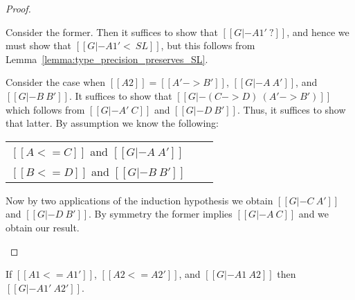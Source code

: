 \begin{proof}
\begin{itemize}
    Consider the former.  Then it suffices to show that $[[G |- A1' ~ ?]]$,
    and hence we must show that $[[G |- A1' <~ SL]]$, but this follows
    from Lemma~\ref{lemma:type_precision_preserves_SL}.

    Consider the case when $[[A2]] = [[A' -> B']]$, $[[G |- A ~ A']]$, and $[[G |- B ~ B']]$.
    It suffices to show that $[[G |- (C -> D) ~ (A' -> B')]]$ which follows from
    $[[G |- A' ~ C]]$ and $[[G |- D ~ B']]$.  Thus, it suffices to show that latter.
    By assumption we know the following:
    \begin{center}
      \begin{tabular}{lll}
        $[[A <= C]]$ and $[[G |- A ~ A']]$\\
        $[[B <= D]]$ and $[[G |- B ~ B']]$
      \end{tabular}
    \end{center}
    Now by two applications of the induction hypothesis we obtain $[[G |- C ~ A']]$
    and $[[G |- D ~ B']]$. By symmetry the former implies $[[G |- A ~ C]]$ and
    we obtain our result.
  \end{itemize}  
\end{proof}

\begin{corollary}
  \label{corollary:congruence_of_type_consistency_along_type_precision}
  If $[[A1 <= A1']]$, $[[A2 <= A2']]$, and $[[G |- A1 ~ A2]]$ then
  $[[G |- A1' ~ A2']]$.  
\end{corollary}


